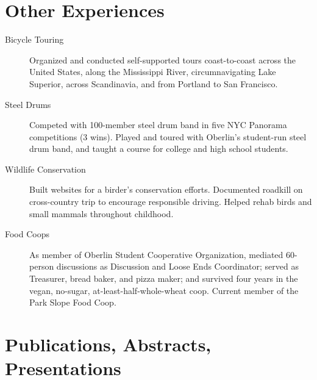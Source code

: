 \documentclass{article}
\begin{document}
  \section*{Other Experiences}
  \begin{description}
      \item[Bicycle Touring]
      Organized and conducted self-supported tours
      coast-to-coast across the United States,
      along the Mississippi River,
      circumnavigating Lake Superior,
      across Scandinavia,
      and from Portland to San Francisco.

      \item[Steel Drums]
      Competed with 100-member steel drum band in five NYC Panorama
      competitions (3 wins). Played and toured with Oberlin's student-run
      steel drum band, and taught a course for college and high school
      students.

      \item[Wildlife Conservation]
      Built websites for a birder's conservation efforts.
      Documented roadkill on cross-country trip to encourage responsible
      driving. Helped rehab birds and small mammals throughout childhood.

      \item[Food Coops]
      As member of Oberlin Student Cooperative Organization,
      mediated 60-person discussions as
      Discussion and Loose Ends Coordinator; served as
      Treasurer, bread baker, and pizza maker; and survived
      four years in the vegan, no-sugar, at-least-half-whole-wheat coop.
      Current member of the Park Slope Food Coop.
  \end{description}

  \section*{Publications, Abstracts, Presentations}
\end{document}
